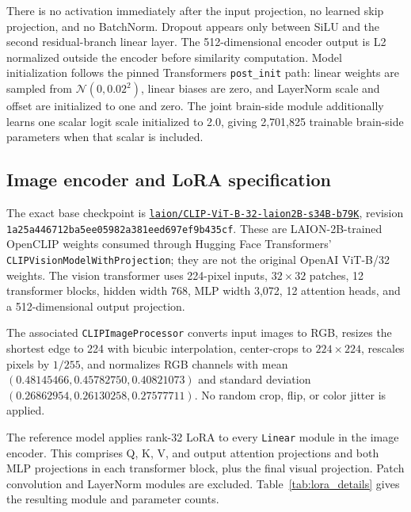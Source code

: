 \documentclass{article}
\begin{document}
There is no activation immediately after the input projection, no learned skip
projection, and no BatchNorm. Dropout appears only between SiLU and the second
residual-branch linear layer. The 512-dimensional encoder output is L2
normalized outside the encoder before similarity computation. Model
initialization follows the pinned Transformers \texttt{post\_init} path:
linear weights are sampled from $\mathcal{N}(0,0.02^2)$, linear biases are
zero, and LayerNorm scale and offset are initialized to one and zero. The
joint brain-side module additionally learns one scalar logit scale initialized
to 2.0, giving 2,701,825 trainable brain-side parameters when that scalar is
included.

\subsection{Image encoder and LoRA specification}
\label{app:image_lora}

The exact base checkpoint is
\href{https://huggingface.co/laion/CLIP-ViT-B-32-laion2B-s34B-b79K}{\texttt{laion/CLIP-ViT-B-32-laion2B-s34B-b79K}},
revision \texttt{1a25a446712ba5ee05982a381eed697ef9b435cf}. These are
LAION-2B-trained OpenCLIP weights consumed through Hugging Face Transformers'
\texttt{CLIPVisionModelWithProjection}; they are not the original OpenAI
ViT-B/32 weights. The vision transformer uses 224-pixel inputs, $32\times32$
patches, 12 transformer blocks, hidden width 768, MLP width 3,072, 12 attention
heads, and a 512-dimensional output projection.

The associated \texttt{CLIPImageProcessor} converts input images to RGB,
resizes the shortest edge to 224 with bicubic interpolation, center-crops to
$224\times224$, rescales pixels by $1/255$, and normalizes RGB channels with
mean $(0.48145466,0.45782750,0.40821073)$ and standard deviation
$(0.26862954,0.26130258,0.27577711)$. No random crop, flip, or color jitter is
applied.

The reference model applies rank-32 LoRA to every \texttt{Linear} module in the
image encoder. This comprises Q, K, V, and output attention projections and
both MLP projections in each transformer block, plus the final visual
projection. Patch convolution and LayerNorm modules are excluded.
Table~\ref{tab:lora_details} gives the resulting module and parameter counts.
\end{document}
